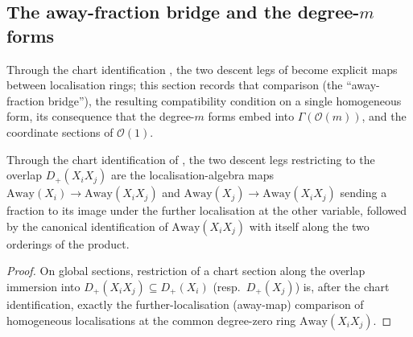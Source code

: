 \subsection{The away-fraction bridge and the degree-\(m\) forms}
\label{subsec:serre_twist_away_bridge}

Through the chart identification , the two
descent legs of  become explicit
maps between localisation rings; this section records that comparison
(the ``away-fraction bridge''), the resulting compatibility condition on a
single homogeneous form, its consequence that the degree-\(m\) forms embed
into \(\Gamma(\mathcal O(m))\), and the coordinate sections of
\(\mathcal O(1)\).

\begin{lemma}
  \label{lem:serre_twist_away_bridge}
  Through the chart identification of , the
  two descent legs restricting to the overlap \(D_+(X_i X_j)\) are the
  localisation-algebra maps \(\mathrm{Away}(X_i) \to \mathrm{Away}(X_i X_j)\)
  and \(\mathrm{Away}(X_j) \to \mathrm{Away}(X_i X_j)\) sending a fraction to
  its image under the further localisation at the other variable, followed
  by the canonical identification of \(\mathrm{Away}(X_i X_j)\) with itself
  along the two orderings of the product.
\end{lemma}
\begin{proof}\leanok
  On global sections, restriction of a chart section along the overlap
  immersion into \(D_+(X_i X_j) \subseteq D_+(X_i)\) (resp.\ \(D_+(X_j)\)) is,
  after the chart identification, exactly the further-localisation
  (away-map) comparison of homogeneous localisations at the common
  degree-zero ring \(\mathrm{Away}(X_i X_j)\).
\end{proof}

